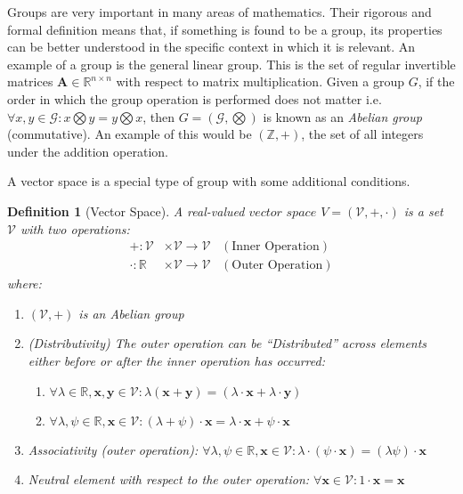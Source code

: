 \documentclass[a4paper,12pt]{book}
\newcommand{\set}[1]{\mathcal{#1}}
\newcommand{\operation}{\bigotimes}
\newcommand{\matrx}[1]{\bm{#1}}
\newcommand{\vectr}[1]{\textbf{#1}}
\newcommand{\real}{\mathbb{R}}
\newcommand{\integers}{\mathbb{Z}}
\newcommand{\italic}[1]{\textit{#1}}
\newtheorem{definition}{Definition}[section]
\begin{document}
	Groups are very important in many areas of mathematics. Their rigorous and formal definition means that, if something is found to be a group, its properties can be better understood in the specific context in which it is relevant.
	An example of a group is the general linear group. This is the set of regular invertible matrices $ \matrx{A} \in \real^{n \times n} $ with respect to matrix multiplication.
	Given a group $ G $, if the order in which the group operation is performed does not matter i.e. $ \forall x, y \in \set{G} : x \operation y = y \operation x $, then $ G = (\set{G}, \operation) $ is known as an \italic{Abelian group} (commutative). An example of this would be $ (\integers, +) $, the set of all integers under the addition operation.
	
	
	A vector space \cite[page 37]{mml_book} is a special type of group with some additional conditions. 
	
	\begin{definition}[Vector Space]
		\normalfont A real-valued $\italic{vector space}$ $V = (\set{V}, +, \cdot)$ is a set $\set{V}$ with two operations:
		\begin{align}
			+: \set{V} &\times \set{V} \rightarrow \set{V} \hspace{10pt} (\text{Inner Operation}) \\
			\cdot: \real &\times \set{V} \rightarrow \set{V} \hspace{10pt} (\text{Outer Operation})
		\end{align}
		where:
		\begin{enumerate}
			\item $(\set{V}, +)$ is an Abelian group
			\item (Distributivity) The outer operation can be ``Distributed'' across elements either before or after the inner operation has occurred: 
			\begin{enumerate}
				\item $\forall \lambda \in \real, \vectr{x}, \vectr{y} \in \mathcal{V}: \lambda (\vectr{x} + \vectr{y}) = (\lambda \cdot \vectr{x} + \lambda \cdot \vectr{y})$
				\item $\forall \lambda, \psi \in \real, \vectr{x} \in \set{V}: (\lambda + \psi) \cdot \vectr{x} = \lambda \cdot \vectr{x} + \psi \cdot \vectr{x}$
			\end{enumerate} 
			\item Associativity (outer operation): $\forall \lambda, \psi \in \real, \vectr{x} \in \set{V}: \lambda \cdot (\psi \cdot \vectr{x}) = (\lambda \psi) \cdot \vectr{x}$
			\item Neutral element with respect to the outer operation: $\forall \vectr{x} \in \set{V}: 1 \cdot \vectr{x} = \vectr{x}$
		\end{enumerate}
		\label{def:vector_space}
	\end{definition}
	
\end{document}
